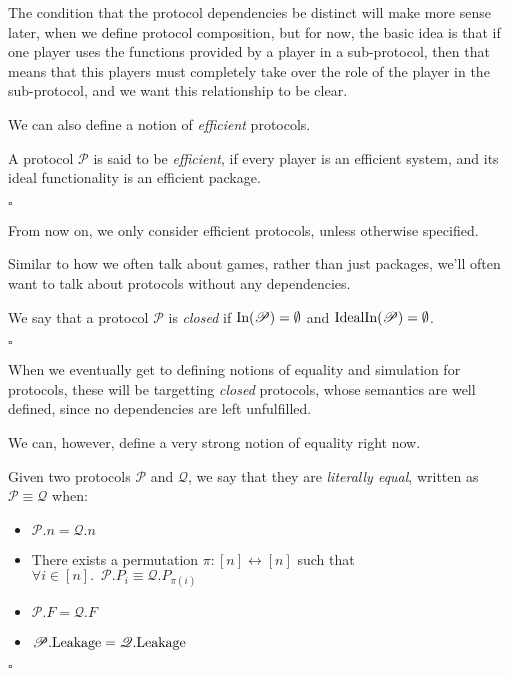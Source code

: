 The condition that the protocol dependencies be distinct
will make more sense later, when we define protocol composition,
but for now, the basic idea is that if one player uses
the functions provided by a player in a sub-protocol,
then that means that this players must completely take over
the role of the player in the sub-protocol,
and we want this relationship to be clear.

We can also define a notion of \emph{efficient} protocols.

\begin{definition}
  A protocol $\mathscr{P}$ is said to be \emph{efficient},
  if every player is an efficient system, and its ideal functionality
  is an efficient package.

  $\square$
\end{definition}

From now on, we only consider efficient protocols, unless otherwise
specified.

Similar to how we often talk about games, rather than just packages,
we'll often want to talk about protocols without any dependencies.

\begin{definition}
  We say that a protocol $\mathscr{P}$ is \emph{closed} if
  $\text{In}(\mathscr{P}) = \emptyset$ and $\text{IdealIn}(\mathscr{P}) = \emptyset$.

  $\square$
\end{definition}

When we eventually get to defining notions of equality and simulation
for protocols, these will be targetting \emph{closed} protocols,
whose semantics are well defined, since no dependencies are left unfulfilled.

We can, however, define a very strong notion of equality right now.

\begin{definition}
Given two protocols $\mathscr{P}$ and $\mathscr{Q}$, we say that
they are \emph{literally equal}, written as $\mathscr{P} \equiv \mathscr{Q}$
when:
\begin{itemize}
\item $\mathscr{P}.n = \mathscr{Q}.n$
\item There exists a permutation $\pi : [n] \leftrightarrow [n]$ such that
$
{\forall i \in [n].\enspace \mathscr{P}.P_i \equiv \mathscr{Q}.P_{\pi(i)}}
$
\item $\mathscr{P}.F = \mathscr{Q}.F$
\item $\mathscr{P}.\text{Leakage} = \mathscr{Q}.\text{Leakage}$
\end{itemize}

$\square$
\end{definition}


